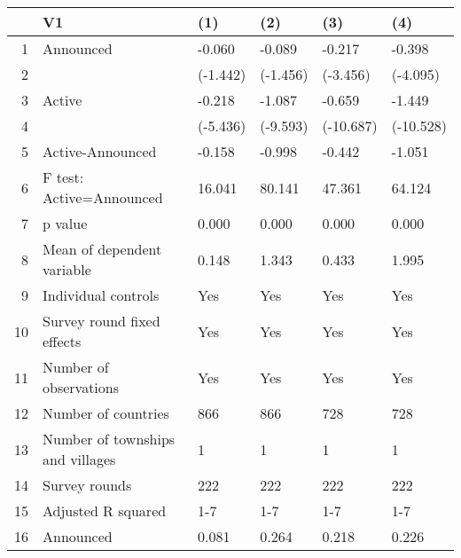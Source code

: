 \begin{table}[ht]
\centering
\begin{tabular}{rlllll}
  \hline
 & V1 & (1) & (2) & (3) & (4) \\ 
  \hline
1 & Announced & -0.060 & -0.089 & -0.217 & -0.398 \\ 
  2 &  & (-1.442) & (-1.456) & (-3.456) & (-4.095) \\ 
  3 & Active & -0.218 & -1.087 & -0.659 & -1.449 \\ 
  4 &  & (-5.436) & (-9.593) & (-10.687) & (-10.528) \\ 
  5 & Active-Announced & -0.158 & -0.998 & -0.442 & -1.051 \\ 
  6 & F test: Active=Announced & 16.041 & 80.141 & 47.361 & 64.124 \\ 
  7 & p value & 0.000 & 0.000 & 0.000 & 0.000 \\ 
  8 & Mean of dependent variable & 0.148 & 1.343 & 0.433 & 1.995 \\ 
  9 & Individual controls & Yes & Yes & Yes & Yes \\ 
  10 & Survey round fixed effects & Yes & Yes & Yes & Yes \\ 
  11 & Number of observations & Yes & Yes & Yes & Yes \\ 
  12 & Number of countries & 866 & 866 & 728 & 728 \\ 
  13 & Number of townships and villages & 1 & 1 & 1 & 1 \\ 
  14 & Survey rounds & 222 & 222 & 222 & 222 \\ 
  15 & Adjusted R squared & 1-7 & 1-7 & 1-7 & 1-7 \\ 
  16 & Announced & 0.081 & 0.264 & 0.218 & 0.226 \\ 
   \hline
\end{tabular}
\end{table}
